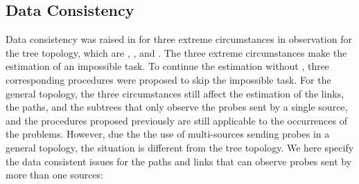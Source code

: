 \documentclass[10pt,twocolumn]{IEEEtran}
\begin{document}
\subsection{Data Consistency}
\label{consistent}

Data consistency  was raised in \cite{CDHT99} for three extreme
circumstances in observation  for the tree topology, which are
, , and . The three extreme circumstances make the
estimation of  an impossible task. To continue the
estimation without , three corresponding procedures were
proposed to skip the impossible task. For the general topology, the
three circumstances still affect the estimation of the links, the
paths, and the subtrees that only observe the probes sent by a single
source, and the procedures proposed previously are still applicable to
the occurrences of the problems. However, due the the use of
multi-sources sending probes in a general topology, the situation is
different from the tree topology. We here specify the data consistent
issues for the paths and links that can observe probes sent by more
than one sources:
\end{document}
